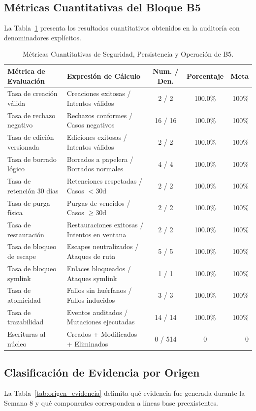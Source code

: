 \documentclass[11pt,a4paper]{article}
\begin{document}
\subsection{Métricas Cuantitativas del Bloque B5}
La Tabla~\ref{tab:metricas_b5} presenta los resultados cuantitativos obtenidos en la auditoría con denominadores explícitos.

\begin{table}[H]
\centering
\small
\begin{tabularx}{\textwidth}{p{3.8cm}Xccr}
\toprule
\textbf{Métrica de Evaluación} & \textbf{Expresión de Cálculo} & \textbf{Num. / Den.} & \textbf{Porcentaje} & \textbf{Meta} \\
\midrule
Tasa de creación válida & Creaciones exitosas / Intentos válidos & 2 / 2 & 100.0\% & 100\% \\
Tasa de rechazo negativo & Rechazos conformes / Casos negativos & 16 / 16 & 100.0\% & 100\% \\
Tasa de edición versionada & Ediciones exitosas / Intentos válidos & 2 / 2 & 100.0\% & 100\% \\
Tasa de borrado lógico & Borrados a papelera / Borrados normales & 4 / 4 & 100.0\% & 100\% \\
Tasa de retención 30 días & Retenciones respetadas / Casos $<30\text{d}$ & 2 / 2 & 100.0\% & 100\% \\
Tasa de purga física & Purgas de vencidos / Casos $\ge 30\text{d}$ & 2 / 2 & 100.0\% & 100\% \\
Tasa de restauración & Restauraciones exitosas / Intentos en ventana & 2 / 2 & 100.0\% & 100\% \\
Tasa de bloqueo de escape & Escapes neutralizados / Ataques de ruta & 5 / 5 & 100.0\% & 100\% \\
Tasa de bloqueo symlink & Enlaces bloqueados / Ataques symlink & 1 / 1 & 100.0\% & 100\% \\
Tasa de atomicidad & Fallos sin huérfanos / Fallos inducidos & 3 / 3 & 100.0\% & 100\% \\
Tasa de trazabilidad & Eventos auditados / Mutaciones ejecutadas & 14 / 14 & 100.0\% & 100\% \\
Escrituras al núcleo & Creados + Modificados + Eliminados & 0 / 514 & 0 & 0 \\
\bottomrule
\end{tabularx}
\caption{Métricas Cuantitativas de Seguridad, Persistencia y Operación de B5.}
\label{tab:metricas_b5}
\end{table}

\subsection{Clasificación de Evidencia por Origen}
La Tabla~\ref{tab:origen_evidencia} delimita qué evidencia fue generada durante la Semana 8 y qué componentes corresponden a líneas base preexistentes.
\end{document}
